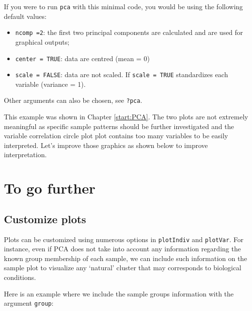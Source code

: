 \documentclass[]{book}
\newenvironment{Shaded}{\begin{snugshade}}{\end{snugshade}}
\newcommand{\KeywordTok}[1]{\textcolor[rgb]{0.13,0.29,0.53}{\textbf{#1}}}
\newcommand{\DataTypeTok}[1]{\textcolor[rgb]{0.13,0.29,0.53}{#1}}
\newcommand{\OtherTok}[1]{\textcolor[rgb]{0.56,0.35,0.01}{#1}}
\newcommand{\OperatorTok}[1]{\textcolor[rgb]{0.81,0.36,0.00}{\textbf{#1}}}
\newcommand{\NormalTok}[1]{#1}
\providecommand{\tightlist}{%
  \setlength{\itemsep}{0pt}\setlength{\parskip}{0pt}}
\theoremstyle{definition}
\theoremstyle{definition}
\theoremstyle{definition}
\theoremstyle{remark}
\begin{document}
If you were to run \texttt{pca} with this minimal code, you would be
using the following default values:

\begin{itemize}
\tightlist
\item
  \texttt{ncomp\ =2}: the first two principal components are calculated
  and are used for graphical outputs;
\item
  \texttt{center\ =\ TRUE}: data are centred (mean = 0)
\item
  \texttt{scale\ =\ FALSE}: data are not scaled. If
  \texttt{scale\ =\ TRUE} standardizes each variable (variance = 1).
\end{itemize}

Other arguments can also be chosen, see \texttt{?pca}.

This example was shown in Chapter \ref{start:PCA}. The two plots are not
extremely meaningful as specific sample patterns should be further
investigated and the variable correlation circle plot plot contains too
many variables to be easily interpreted. Let's improve those graphics as
shown below to improve interpretation.

\section{To go further}\label{to-go-further}

\subsection{Customize plots}\label{customize-plots}

Plots can be customized using numerous options in \texttt{plotIndiv} and
\texttt{plotVar}. For instance, even if PCA does not take into account
any information regarding the known group membership of each sample, we
can include such information on the sample plot to visualize any
`natural' cluster that may corresponds to biological conditions.

Here is an example where we include the sample groups information with
the argument \texttt{group}:

\begin{Shaded}
\end{Shaded}
\end{document}
